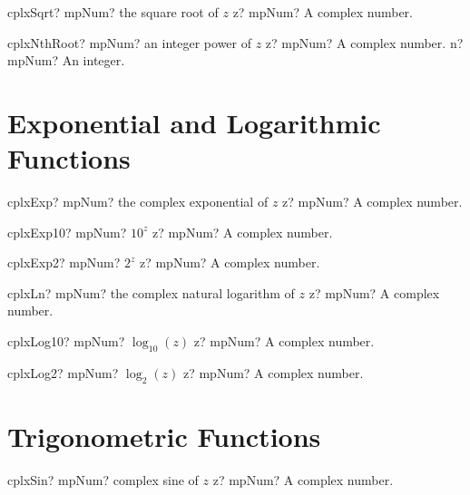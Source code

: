 \documentclass[12pt,a4paper,openany]{book}
\begin{document}
\begin{mpFunctionsExtract}
\mpFunctionOne
{cplxSqrt? mpNum? the square root of $z$}
{z? mpNum? A complex number.}
\end{mpFunctionsExtract}

\begin{mpFunctionsExtract}
\mpFunctionTwo
{cplxNthRoot? mpNum? an integer power of $z$}
{z? mpNum? A complex number.}
{n? mpNum? An integer.}
\end{mpFunctionsExtract}

\section{Exponential and Logarithmic Functions}

\begin{mpFunctionsExtract}
\mpFunctionOne
{cplxExp? mpNum? the complex exponential of $z$}
{z? mpNum? A complex number.}
\end{mpFunctionsExtract}

\begin{mpFunctionsExtract}
\mpFunctionOne
{cplxExp10? mpNum?  $10^z$}
{z? mpNum? A complex number.}
\end{mpFunctionsExtract}

\begin{mpFunctionsExtract}
\mpFunctionOne
{cplxExp2? mpNum?  $2^z$}
{z? mpNum? A complex number.}
\end{mpFunctionsExtract}

\begin{mpFunctionsExtract}
\mpFunctionOne
{cplxLn? mpNum? the complex natural logarithm of $z$}
{z? mpNum? A complex number.}
\end{mpFunctionsExtract}

\begin{mpFunctionsExtract}
\mpFunctionOne
{cplxLog10? mpNum? $\log_{10}(z)$}
{z? mpNum? A complex number.}
\end{mpFunctionsExtract}

\begin{mpFunctionsExtract}
\mpFunctionOne
{cplxLog2? mpNum? $\log_{2}(z)$}
{z? mpNum? A complex number.}
\end{mpFunctionsExtract}

\section{Trigonometric Functions}

\begin{mpFunctionsExtract}
\mpFunctionOne
{cplxSin? mpNum? complex sine of $z$}
{z? mpNum? A complex number.}
\end{mpFunctionsExtract}
\end{document}
